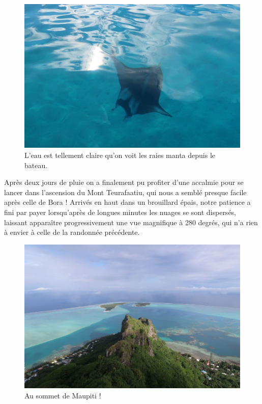 \begin{figure}
\centering
\includegraphics{images/20180820_raiemanta.JPG}
\caption{L'eau est tellement claire qu'on voit les raies manta depuis le
bateau.}
\end{figure}

Après deux jours de pluie on a finalement pu profiter d'une accalmie
pour se lancer dans l'ascension du Mont Teurafaatiu, qui nous a semblé
presque facile après celle de Bora ! Arrivés en haut dans un brouillard
épais, notre patience a fini par payer lorsqu'après de longues minutes
les nuages se sont dispersés, laissant apparaître progressivement une
vue magnifique à 280 degrés, qui n'a rien à envier à celle de la
randonnée précédente.

\begin{figure}
\centering
\includegraphics{images/20180820_maupitisommet.JPG}
\caption{Au sommet de Maupiti !}
\end{figure}

